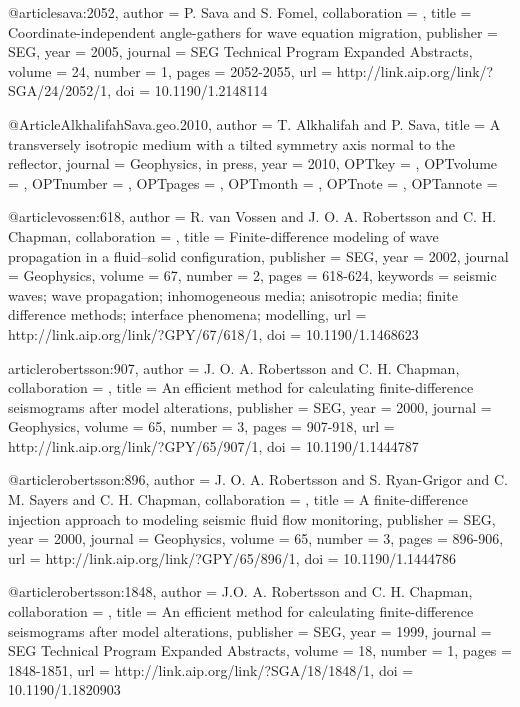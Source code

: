 {@article{sava:2052,
author = {P. Sava and S. Fomel},
collaboration = {},
title = {Coordinate-independent angle-gathers for wave equation migration},
publisher = {SEG},
year = {2005},
journal = {SEG Technical Program Expanded Abstracts},
volume = {24},
number = {1},
pages = {2052-2055},
url = {http://link.aip.org/link/?SGA/24/2052/1},
doi = {10.1190/1.2148114}
}


@Article{AlkhalifahSava.geo.2010,
  author = 	 {T. Alkhalifah and P. Sava},
  title = 	 {A transversely isotropic medium with a tilted
                  symmetry axis normal to the reflector},
  journal = 	 {Geophysics, in press},
  year = 	 {2010},
  OPTkey = 	 {},
  OPTvolume = 	 {},
  OPTnumber = 	 {},
  OPTpages = 	 {},
  OPTmonth = 	 {},
  OPTnote = 	 {},
  OPTannote = 	 {}
}


@article{vossen:618,
author = {R. van Vossen and J. O. A. Robertsson and C. H. Chapman},
collaboration = {},
title = {Finite-difference modeling of wave propagation in a fluid--solid configuration},
publisher = {SEG},
year = {2002},
journal = {Geophysics},
volume = {67},
number = {2},
pages = {618-624},
keywords = {seismic waves; wave propagation; inhomogeneous media; anisotropic media; finite difference methods; interface phenomena; modelling},
url = {http://link.aip.org/link/?GPY/67/618/1},
doi = {10.1190/1.1468623}
}

article{robertsson:907,
author = {J. O. A. Robertsson and C. H. Chapman},
collaboration = {},
title = {An efficient method for calculating finite-difference seismograms after model alterations},
publisher = {SEG},
year = {2000},
journal = {Geophysics},
volume = {65},
number = {3},
pages = {907-918},
url = {http://link.aip.org/link/?GPY/65/907/1},
doi = {10.1190/1.1444787}
}

@article{robertsson:896,
author = {J. O. A. Robertsson and S. Ryan-Grigor and C. M. Sayers and C. H. Chapman},
collaboration = {},
title = {A finite-difference injection approach to modeling seismic fluid flow monitoring},
publisher = {SEG},
year = {2000},
journal = {Geophysics},
volume = {65},
number = {3},
pages = {896-906},
url = {http://link.aip.org/link/?GPY/65/896/1},
doi = {10.1190/1.1444786}
}







@article{robertsson:1848,
author = {J.O. A. Robertsson and C. H. Chapman},
collaboration = {},
title = {An efficient method for calculating finite-difference seismograms after model alterations},
publisher = {SEG},
year = {1999},
journal = {SEG Technical Program Expanded Abstracts},
volume = {18},
number = {1},
pages = {1848-1851},
url = {http://link.aip.org/link/?SGA/18/1848/1},
doi = {10.1190/1.1820903}
}







}

